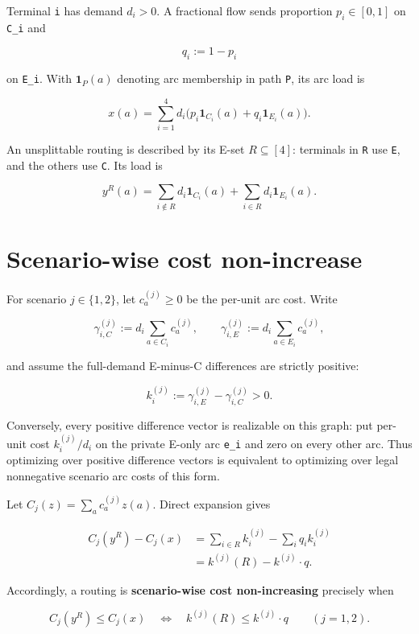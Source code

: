\documentclass[
  11pt,
]{article}
\begin{document}
Terminal \texttt{i} has demand \(d_i>0\). A fractional flow sends
proportion \(p_i\in[0,1]\) on \texttt{C\_i} and

\[
q_i:=1-p_i
\]

on \texttt{E\_i}. With \(\mathbf 1_P(a)\) denoting arc membership in
path \texttt{P}, its arc load is

\[
x(a)=\sum_{i=1}^4 d_i
\bigl(p_i\mathbf 1_{C_i}(a)+q_i\mathbf 1_{E_i}(a)\bigr).
\tag{1}
\]

An unsplittable routing is described by its E-set \(R\subseteq[4]\):
terminals in \texttt{R} use \texttt{E}, and the others use \texttt{C}.
Its load is

\[
y^R(a)=
\sum_{i\notin R}d_i\mathbf 1_{C_i}(a)
+
\sum_{i\in R}d_i\mathbf 1_{E_i}(a).
\tag{2}
\]

\section{Scenario-wise cost
non-increase}\label{scenario-wise-cost-non-increase}

For scenario \(j\in\{1,2\}\), let \(c_a^{(j)}\ge0\) be the per-unit arc
cost. Write

\[
\gamma_{i,C}^{(j)}
:=d_i\sum_{a\in C_i}c_a^{(j)},
\qquad
\gamma_{i,E}^{(j)}
:=d_i\sum_{a\in E_i}c_a^{(j)},
\]

and assume the full-demand E-minus-C differences are strictly positive:

\[
k_i^{(j)}
:=\gamma_{i,E}^{(j)}-\gamma_{i,C}^{(j)}>0.
\tag{3}
\]

Conversely, every positive difference vector is realizable on this
graph: put per-unit cost \(k_i^{(j)}/d_i\) on the private E-only arc
\texttt{e\_i} and zero on every other arc. Thus optimizing over positive
difference vectors is equivalent to optimizing over legal nonnegative
scenario arc costs of this form.

Let \(C_j(z)=\sum_a c_a^{(j)}z(a)\). Direct expansion gives

\[
\begin{aligned}
C_j(y^R)-C_j(x)
&=\sum_{i\in R}k_i^{(j)}-\sum_iq_i k_i^{(j)}\\
&=k^{(j)}(R)-k^{(j)}\!\cdot q.
\end{aligned}
\tag{4}
\]

Accordingly, a routing is \textbf{scenario-wise cost non-increasing}
precisely when

\[
C_j(y^R)\le C_j(x)
\quad\Longleftrightarrow\quad
k^{(j)}(R)\le k^{(j)}\!\cdot q
\qquad(j=1,2).
\tag{5}
\]
\end{document}
